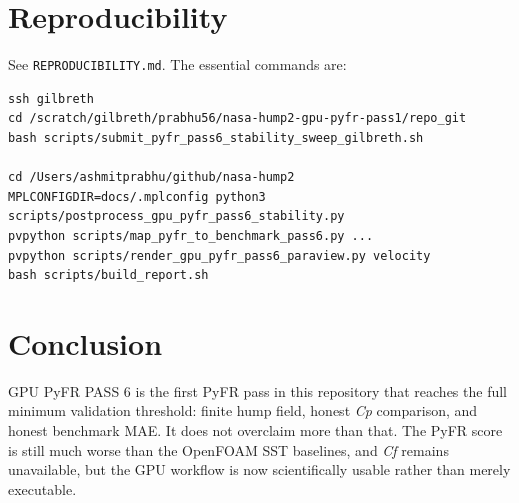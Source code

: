 \documentclass[11pt]{article}
\begin{document}
\section{Reproducibility}
See \texttt{REPRODUCIBILITY.md}. The essential commands are:
\begin{lstlisting}[basicstyle=\ttfamily\small,breaklines=true]
ssh gilbreth
cd /scratch/gilbreth/prabhu56/nasa-hump2-gpu-pyfr-pass1/repo_git
bash scripts/submit_pyfr_pass6_stability_sweep_gilbreth.sh

cd /Users/ashmitprabhu/github/nasa-hump2
MPLCONFIGDIR=docs/.mplconfig python3 scripts/postprocess_gpu_pyfr_pass6_stability.py
pvpython scripts/map_pyfr_to_benchmark_pass6.py ...
pvpython scripts/render_gpu_pyfr_pass6_paraview.py velocity
bash scripts/build_report.sh
\end{lstlisting}

\section{Conclusion}
GPU PyFR PASS 6 is the first PyFR pass in this repository that reaches the full minimum validation threshold: finite hump field, honest \textit{Cp} comparison, and honest benchmark MAE. It does not overclaim more than that. The PyFR score is still much worse than the OpenFOAM SST baselines, and \textit{Cf} remains unavailable, but the GPU workflow is now scientifically usable rather than merely executable.



\end{document}
